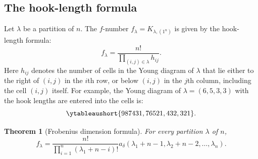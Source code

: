 \documentclass[11pt]{amsart}
\newtheorem{theorem}{Theorem}[subsection]
\theoremstyle{definition}
\theoremstyle{example}
\begin{document}
\subsection{The hook-length formula}
\label{sec:hook-length-fmla}
Let $\lambda$ be a partition of $n$.
The $f$-number $f_\lambda = K_{\lambda,(1^n)}$ is given by the hook-length formula:
\begin{equation}
  \label{eq:1hook-length-fmla}
  f_\lambda = \frac{n!}{\prod_{(i,j)\in \lambda} h_{ij}}.
\end{equation}
Here $h_{ij}$ denotes the number of cells in the Young diagram of $\lambda$ that lie either to the right of $(i,j)$ in the $i$th row, or below $(i,j)$ in the $j$th column, including the cell $(i,j)$ itself.
For example, the Young diagram of $\lambda=(6,5,3,3)$ with the hook lengths are entered into the cells is:
\begin{displaymath}
  \ytableaushort{987431,76521,432,321}.
\end{displaymath}
\begin{theorem}
  [Frobenius dimension formula]
  For every partition $\lambda$ of $n$,
  \begin{displaymath}
    f_\lambda = \frac{n!}{\prod_{i=1}^n(\lambda_1 + n - i)!}a_\delta(\lambda_1+n-1,\lambda_2+n-2,\dotsc,\lambda_n).
  \end{displaymath}
\end{theorem}
\end{document}
